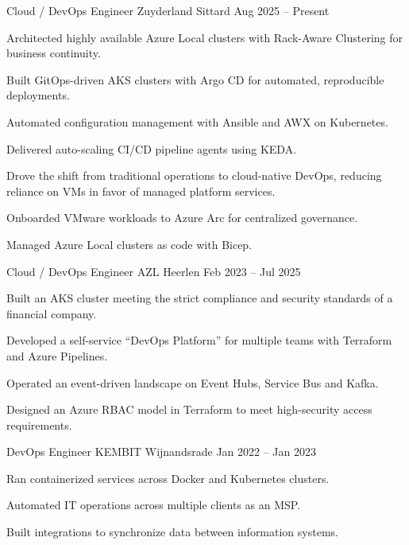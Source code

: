 \documentclass[11pt, a4paper]{awesome-cv}
\begin{document}
\begin{cventries}


  \cventry
    {Cloud / DevOps Engineer}
    {Zuyderland}
    {Sittard}
    {Aug 2025 -- Present}
    {
      \begin{cvitems}
        \item{Architected highly available Azure Local clusters with Rack-Aware Clustering for business continuity.}
        \item{Built GitOps-driven AKS clusters with Argo CD for automated, reproducible deployments.}
        \item{Automated configuration management with Ansible and AWX on Kubernetes.}
        \item{Delivered auto-scaling CI/CD pipeline agents using KEDA.}
        \item{Drove the shift from traditional operations to cloud-native DevOps, reducing reliance on VMs in favor of managed platform services.}
        \item{Onboarded VMware workloads to Azure Arc for centralized governance.}
        \item{Managed Azure Local clusters as code with Bicep.}
      \end{cvitems}
    }


  \cventry
    {Cloud / DevOps Engineer}
    {AZL}
    {Heerlen}
    {Feb 2023 -- Jul 2025}
    {
      \begin{cvitems}
        \item{Built an AKS cluster meeting the strict compliance and security standards of a financial company.}
        \item{Developed a self-service “DevOps Platform” for multiple teams with Terraform and Azure Pipelines.}
        \item{Operated an event-driven landscape on Event Hubs, Service Bus and Kafka.}
        \item{Designed an Azure RBAC model in Terraform to meet high-security access requirements.}
      \end{cvitems}
    }


  \cventry
    {DevOps Engineer}
    {KEMBIT}
    {Wijnandsrade}
    {Jan 2022 -- Jan 2023}
    {
      \begin{cvitems}
        \item{Ran containerized services across Docker and Kubernetes clusters.}
        \item{Automated IT operations across multiple clients as an MSP.}
        \item{Built integrations to synchronize data between information systems.}
      \end{cvitems}
    }



\end{cventries}
\end{document}
